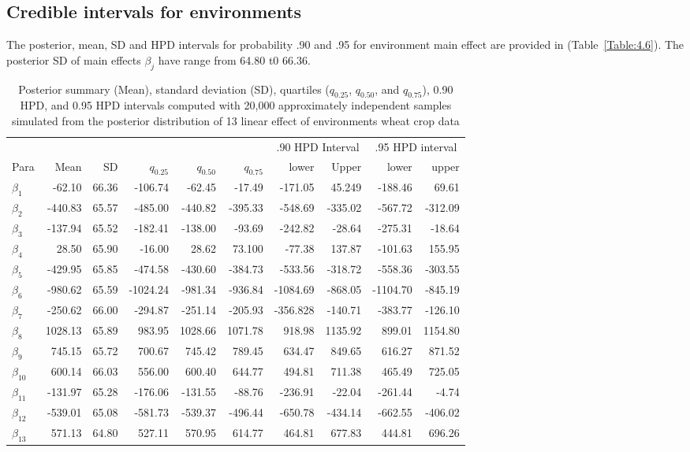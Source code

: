 \subsection{Credible intervals for environments}
The posterior, mean, SD and HPD intervals for probability .90 and .95 for environment main effect are provided in (Table~\ref{Table:4.6}). The posterior SD of main effects $\beta_j$ have range from 64.80 t0 66.36.
\begin{table}[h!]
	\centering
	\caption[HPD table for environments]{Posterior summary (Mean), standard deviation (SD), quartiles ($q_{0.25}$, $q_{0.50}$, and $q_{0.75}$), 0.90 HPD, and 0.95 HPD intervals computed with 20,000 approximately independent samples simulated from the posterior distribution of  13 linear effect of environments wheat crop data} 
	\label{Table:4.5}
	\begin{tabular}{l r r r r r r r r r} 
		\toprule
		&&&&& & \multicolumn{2}{c}{.90 HPD Interval} 
		&\multicolumn{2}{c}{ .95 HPD interval}  \\
		\cmidrule(r){7-8}  \cmidrule(lr){9-10} 
		Para & Mean & SD & $q_{0.25}$ &$q_{0.50}$ & $q_{0.75}$ & lower & Upper & lower & upper\\
		\midrule
		
$\beta_1$  & -62.10  & 66.36 & -106.74 &-62.45  & -17.49  &-171.05 & 45.249 &-188.46 & 69.61 \\
$\beta_2$  &-440.83  & 65.57 & -485.00 &-440.82 & -395.33 &-548.69 & -335.02&-567.72 &-312.09\\
$\beta_3$  &-137.94  & 65.52 &-182.41  &-138.00 &-93.69   & -242.82& -28.64 &-275.31 &-18.64\\
$\beta_4$  & 28.50   & 65.90 &-16.00   & 28.62  & 73.100  &	-77.38 & 137.87 &-101.63 & 155.95 \\
$\beta_5$  &-429.95  & 65.85 & -474.58 &-430.60 & -384.73 &	-533.56& -318.72&-558.36 &-303.55\\
$\beta_6$  &-980.62  & 65.59 &-1024.24 &-981.34 & -936.84 &-1084.69&-868.05 &-1104.70&-845.19 \\
$\beta_7$  &-250.62  & 66.00 &-294.87  &-251.14 &-205.93  &-356.828&-140.71 &-383.77 &-126.10 \\
$\beta_8$  & 1028.13 & 65.89 & 983.95  & 1028.66& 1071.78 &	918.98 & 1135.92& 899.01 & 1154.80 \\
$\beta_9$  & 745.15	 & 65.72 & 700.67  & 745.42 & 789.45  &	634.47 & 849.65 & 616.27 & 871.52 \\
$\beta_{10}$& 600.14 & 66.03 & 556.00  & 600.40 & 644.77  &	494.81 & 711.38 & 465.49 & 725.05 \\
$\beta_{11}$&-131.97 & 65.28 &-176.06  & -131.55& -88.76  &-236.91 &-22.04  &-261.44 &-4.74  \\
$\beta_{12}$&-539.01 & 65.08 &-581.73  &-539.37 & -496.44 &	-650.78&-434.14 &-662.55 &-406.02 \\
$\beta_{13}$& 571.13 & 64.80 & 527.11  & 570.95 & 614.77  &	464.81 & 677.83 & 444.81 & 696.26 \\
		\bottomrule
	\end{tabular}
\end{table} 








